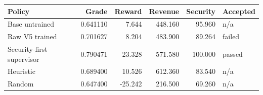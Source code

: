 \begin{tabular}{lrrrrl}
\toprule
Policy & Grade & Reward & Revenue & Security & Accepted \\
\midrule
Base untrained & 0.641110 & 7.644 & 448.160 & 95.960 & n/a \\
Raw V5 trained & 0.701627 & 8.204 & 483.900 & 89.264 & failed \\
Security-first supervisor & 0.790471 & 23.328 & 571.580 & 100.000 & passed \\
Heuristic & 0.689400 & 10.526 & 612.360 & 83.540 & n/a \\
Random & 0.647400 & -25.242 & 216.500 & 69.260 & n/a \\
\bottomrule
\end{tabular}
